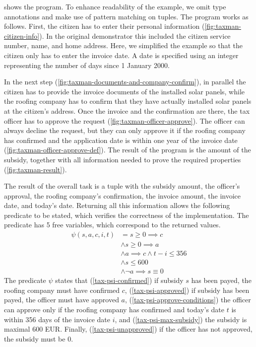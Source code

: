  shows the program.
To enhance readability of the example,
we omit type annotations and make use of pattern matching on tuples.
The program works as follows.
First, the citizen has to enter their personal information (\cref{fig:taxman-citizen-info}).
In the original demonstrator this included the citizen service number, name, and home address.
Here, we simplified the example so that the citizen only has to enter the invoice date.
A date is specified using an integer representing the number of days since 1 January 2000.

In the next step (\cref{fig:taxman-documents-and-company-confirm}), in parallel the citizen has to provide the invoice documents of the installed solar panels, while the roofing company has to confirm that they have actually installed solar panels at the citizen's address.
Once the invoice and the confirmation are there, the tax officer has to approve the request (\cref{fig:taxman-officer-approve}).
The officer can always decline the request, but they can only approve it if the roofing company has confirmed and the application date is within one year of the invoice date (\cref{fig:taxman-officer-approve-def}).
The result of the program is the amount of the subsidy, together with all information needed to prove the required properties (\cref{fig:taxman-result}).

The result of the overall task is a tuple with the subsidy amount, the officer's approval, the roofing company's confirmation, the invoice amount, the invoice date, and today's date.
Returning all this information allows the following predicate to be stated, which verifies the correctness of the implementation.
The predicate has 5 free variables, which correspond to the returned values.
\setcounter{equation}{0}
\begin{align}
\psi(s,a,c,i,t)
   & =      s \geq 0 \implies c \label{tax-psi-confirmed}
\\ & \wedge s \geq 0 \implies a \label{tax-psi-approved}
\\ & \wedge a \implies c \wedge t - i \leq 356 \label{tax-psi-approve-conditions}
\\ & \wedge s \leq 600 \label{tax-psi-max-subsidy}
\\ & \wedge \lnot a \implies s \equiv 0 \label{tax-psi-unapproved}
\end{align}
The predicate $\psi$ states that (\ref{tax-psi-confirmed}) if subsidy $s$ has been payed, the roofing company must have confirmed $c$, (\ref{tax-psi-approved}) if subsidy has been payed, the officer must have approved $a$, (\ref{tax-psi-approve-conditions}) the officer can approve only if the roofing company has confirmed and today's date $t$ is within 356 days of the invoice date $i$, and (\ref{tax-psi-max-subsidy}) the subsidy is maximal 600 EUR.
Finally, (\ref{tax-psi-unapproved}) if the officer has not approved, the subsidy must be 0.



